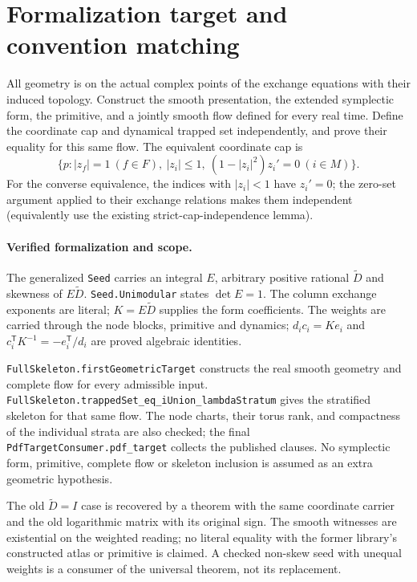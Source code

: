 \documentclass[11pt,a4paper]{article}
\begin{document}
\section*{Formalization target and convention matching}
All geometry is on the actual complex points of the exchange equations with
their induced topology. Construct the smooth presentation, the extended
symplectic form, the primitive, and a jointly smooth flow defined for every
real time. Define the coordinate cap and dynamical trapped set independently,
and prove their equality for this same flow. The equivalent coordinate cap is
\[
\{p: |z_f|=1\ (f\in F),\ |z_i|\le1,\ (1-|z_i|^2)z_i'=0\ (i\in M)\}.
\]
For the converse equivalence, the indices with $|z_i|<1$ have $z_i'=0$;
the zero-set argument applied to their exchange relations makes them
independent (equivalently use the existing strict-cap-independence lemma).

\paragraph{Verified formalization and scope.}
The generalized \nolinkurl{Seed} carries an integral $E$, arbitrary
positive rational $\widetilde D$ and skewness of $E\widetilde D$.
\nolinkurl{Seed.Unimodular} states $\det E=1$. The column exchange
exponents are literal; $K=E\widetilde D$ supplies the form coefficients.
The weights are carried through the node blocks, primitive and dynamics;
$d_i c_i=Ke_i$ and $c_i^{\mathsf T}K^{-1}=-e_i^{\mathsf T}/d_i$
are proved algebraic identities.

\nolinkurl{FullSkeleton.firstGeometricTarget} constructs the real smooth
geometry and complete flow for every admissible input.
\nolinkurl{FullSkeleton.trappedSet_eq_iUnion_lambdaStratum} gives the
stratified skeleton for that same flow. The node charts, their torus rank,
and compactness of the individual strata are also checked; the final
\nolinkurl{PdfTargetConsumer.pdf_target} collects the published clauses.
No symplectic form, primitive, complete flow or skeleton inclusion is
assumed as an extra geometric hypothesis.

The old $\widetilde D=I$ case is recovered by a theorem with the same
coordinate carrier and the old logarithmic matrix with its original sign.
The smooth witnesses are existential on the weighted reading; no literal
equality with the former library's constructed atlas or primitive is
claimed. A checked non-skew seed with unequal weights is a consumer of
the universal theorem, not its replacement.
\end{document}
